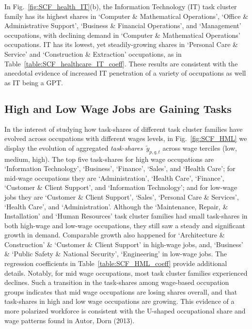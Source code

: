 \documentclass[letterpaper]{article} %
\begin{document}
In Fig.~\ref{fig:SCF_health_IT}(b), the Information Technology (IT) task cluster family has its highest shares in `Computer \& Mathematical Operations', `Office \& Administrative Support', `Business \& Financial Operations', and `Management' occupations, with declining demand in `Computer \& Mathematical Operations' occupations. IT has its lowest, yet steadily-growing shares in `Personal Care \& Service' and `Construction \& Extraction' occupations, as in Table~\ref{table:SCF_healthcare_IT_coeff}. These results are consistent with the anecdotal evidence of increased IT penetration of a variety of occupations as well as IT being a GPT. 

\subsection{High and Low Wage Jobs are Gaining Tasks}
\label{subsec:mid_wage}
%
In the interest of studying how task-shares of different task cluster families have evolved across occupations with different wages levels, in Fig.~\ref{fig:SCF_HML} we display the evolution of aggregated \emph{task-shares}~$\tilde{y}_{p,q,t}$ across wage terciles (low, medium, high). The top five task-shares for high wage occupations are `Information Technology', `Business', `Finance', `Sales', and `Health Care'; for mid-wage occupations they are `Administration', `Health Care', `Finance', `Customer \& Client Support', and `Information Technology'; and for low-wage jobs they are `Customer \& Client Support', `Sales', `Personal Care \& Services', `Health Care', and `Administration'. Although the `Maintenance, Repair, \& Installation' and `Human Resources' task cluster families had small task-shares in both high-wage and low-wage occupations, they still saw a steady and significant growth in demand. Comparable growth also happened for `Architecture \& Construction' \& `Customer \& Client Support' in high-wage jobs, and, `Business' \& `Public Safety \& National Security', `Engineering' in low-wage jobs. The regression coefficients in Table~\ref{table:SCF_HML_coeff} provide additional details. Notably, for mid wage occupations, most task cluster families experienced declines. Such a transition in the task-shares among wage-based occupation groups indicates that mid wage occupations are losing shares overall, and that task-shares in high and low wage occupations are growing. This evidence of a more polarized workforce is consistent with the U-shaped occupational share and wage patterns found in Autor, Dorn (2013).
\end{document}

